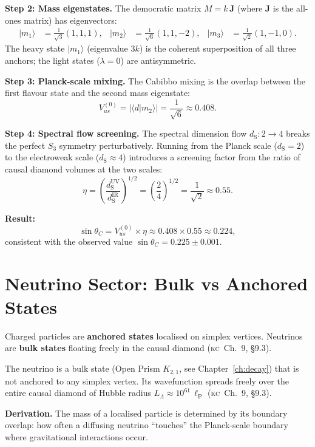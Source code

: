 \documentclass[11pt, a4paper, openany]{book}
\newcommand{\lP}{\ell_{\mathrm{P}}}
\newcommand{\dS}{d_{\mathrm{S}}}
\newcommand{\KC}[1]{\textnormal{(\textsc{kc}~#1)}}
\newcounter{thm}[chapter]
\begin{document}
\textbf{Step 2: Mass eigenstates.} The democratic matrix
$M = k\,\mathbf{J}$ (where $\mathbf{J}$ is the all-ones matrix) has
eigenvectors:
\begin{align}
  |m_1\rangle &= \tfrac{1}{\sqrt{3}}(1,1,1), &
  |m_2\rangle &= \tfrac{1}{\sqrt{6}}(1,1,-2), &
  |m_3\rangle &= \tfrac{1}{\sqrt{2}}(1,-1,0).
\end{align}
The heavy state $|m_1\rangle$ (eigenvalue $3k$) is the coherent
superposition of all three anchors; the light states ($\lambda = 0$)
are antisymmetric.

\textbf{Step 3: Planck-scale mixing.} The Cabibbo mixing is the
overlap between the first flavour state and the second mass eigenstate:
\[
  V_{us}^{(0)} = |\langle d | m_2\rangle|
  = \frac{1}{\sqrt{6}} \approx 0.408.
\]

\textbf{Step 4: Spectral flow screening.} The spectral dimension flow
$\dS: 2 \to 4$ breaks the perfect $S_3$ symmetry perturbatively.
Running from the Planck scale ($\dS = 2$) to the electroweak scale
($\dS \approx 4$) introduces a screening factor from the ratio of
causal diamond volumes at the two scales:
\[
  \eta = \left(\frac{\dS^{\mathrm{UV}}}{\dS^{\mathrm{IR}}}\right)^{1/2}
  = \left(\frac{2}{4}\right)^{1/2} = \frac{1}{\sqrt{2}} \approx 0.55.
\]

\textbf{Result:}
\[
  \sin\theta_C = V_{us}^{(0)} \times \eta
  \approx 0.408 \times 0.55 \approx 0.224,
\]
consistent with the observed value $\sin\theta_C = 0.225 \pm 0.001$.

\section{Neutrino Sector: Bulk vs Anchored States}\label{sec:neutrinos}

Charged particles are \textbf{anchored states} localised on simplex vertices. Neutrinos are \textbf{bulk states} floating freely in the causal diamond \KC{Ch.~9, \S9.3}.

\begin{theorem}\label{thm:neutrino-mass}
The neutrino is a bulk state (Open Prism $K_{2,1}$, see
Chapter~\ref{ch:decay}) that is not anchored to any simplex vertex.
Its wavefunction spreads freely over the entire causal diamond of
Hubble radius $L_\Lambda \approx 10^{61}\,\lP$ \KC{Ch.~9, \S9.3}.
\end{theorem}

\noindent
\textbf{Derivation.} The mass of a localised particle is determined by
its boundary overlap: how often a diffusing neutrino ``touches'' the
Planck-scale boundary where gravitational interactions occur.
\end{document}
